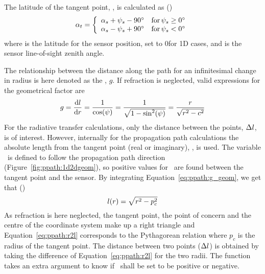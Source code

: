 The latitude of the tangent point, , is calculated as
()
\begin{equation}
  \alpha_{t} = \left\{
   \begin{array}{ll}
    \alpha_{s}+\psi_{s}-90^\circ & \textrm{for}\, \psi_{s}\geq 0^\circ \\
    \alpha_{s}-\psi_{s}+90^\circ & \textrm{for}\, \psi_{s}< 0^\circ 
   \end{array}   \right.
  \label{eq:ppath:pc2alphatan}
\end{equation}
where  is the latitude for the sensor position, set to
0\degree for 1D cases, and  is the sensor line-of-sight
zenith angle.

The relationship between the distance along the path for an
infinitesimal change in radius is here denoted as the
, $g$. If refraction is neglected, valid
expressions for the geometrical factor are
\begin{equation}
  g = \frac{\mathrm{d} l}{\mathrm{d} r} 
           = \frac{1}{\cos(\psi)} = \frac{1}{\sqrt{1-\sin^2(\psi)}}
                                            = \frac{r}{\sqrt{r^2-c^2}}
  \label{eq:ppath:g_geom}
\end{equation}
For the radiative transfer calculations, only the distance between the
points, $\Delta l$, is of interest. However, internally for
the propagation path calculations the absolute length from the tangent
point (real or imaginary), \PpathLng, is used. The variable \PpathLng\ 
is defined to follow the propagation path direction
(Figure~\ref{fig:ppath:1d2dgeom}), so positive values for \PpathLng\ 
are found between the tangent point and the sensor. By integrating
Equation~\ref{eq:ppath:g_geom}, we get that ()
\begin{equation}
  l(r) = \sqrt{r^2-p_c^2} 
  \label{eq:ppath:r2l}
\end{equation}
As refraction is here neglected, the tangent point, the point of
concern and the centre of the coordinate system make up a right
triangle and Equation~\ref{eq:ppath:r2l} corresponds to the
Pythagorean relation where $p_c$ is the radius of the tangent point.
The distance between two points ($\Delta l$) is obtained by
taking the difference of Equation~\ref{eq:ppath:r2l} for the two
radii. The function \artsstyle{geomppath\_r2l} takes an extra argument
to know if \PpathLng\ shall be set to be positive or negative.

